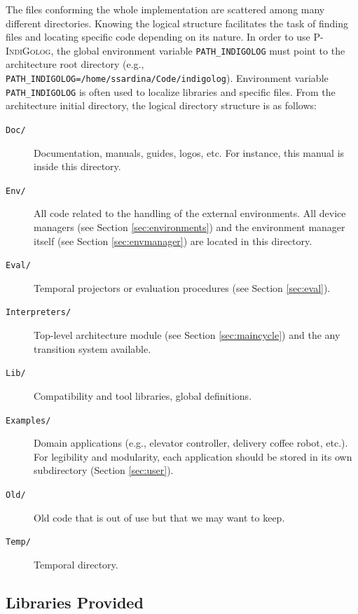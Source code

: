 \documentclass[11pt]{article}
\newcommand{\PIndiGolog}{\mbox{\textsc{P-IndiGolog}}}
\begin{document}
The files conforming the whole implementation are scattered among many different
directories. Knowing the logical structure facilitates the task of finding files
and locating specific code depending on its nature.
%
In order to use \PIndiGolog, the global environment variable
\texttt{PATH\_INDIGOLOG} must point to the architecture root directory (e.g., 
\texttt{PATH\_INDIGOLOG=/home/ssardina/Code/indigolog}).
Environment variable \texttt{PATH\_INDIGOLOG} is often used to localize
libraries and specific files. From the architecture initial directory, the
logical directory structure is as follows:

\begin{description}
\item[\texttt{Doc/}] Documentation, manuals, guides, logos, etc. For instance,
this manual is inside this directory.
  
\item[\texttt{Env/}] All code related to the handling of the external
environments. All device managers (see Section \ref{sec:environments}) and the
environment manager itself (see Section \ref{sec:envmanager}) are located in
this directory.
  
\item[\texttt{Eval/}] Temporal projectors or evaluation procedures (see Section
  \ref{sec:eval}).
  
\item[\texttt{Interpreters/}] Top-level architecture module (see Section
  \ref{sec:maincycle}) and the any transition system available.

\item[\texttt{Lib/}] Compatibility and tool libraries, global definitions.

  
\item[\texttt{Examples/}] Domain applications (e.g., elevator controller,
  delivery coffee robot, etc.). For legibility and modularity, each application
should be stored in its own subdirectory (Section \ref{sec:user}).
  
\item[\texttt{Old/}] Old code that is out of use but that we may want to keep.

\item[\texttt{Temp/}] Temporal directory.
\end{description}




\subsection{Libraries Provided}
\end{document}
